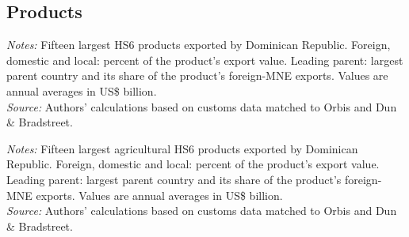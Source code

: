 \documentclass[11pt,a4paper]{article}
\begin{document}
\subsection{Products}
\begin{table}[H]\centering\footnotesize%
  \caption{Dominican Republic: Fifteen Largest Export Products}%
  \label{tab:c_hs6_DOM}%
  \par\vspace{3pt}%
  \begin{minipage}{0.95\textwidth}\footnotesize %
  \textit{Notes:} Fifteen largest HS6 products exported by Dominican Republic. Foreign, domestic and local: percent of the product's export value. Leading parent: largest parent country and its share of the product's foreign-MNE exports. Values are annual averages in US\$ billion.\\[3pt]%
  \textit{Source:} Authors' calculations based on customs data matched to Orbis and Dun \& Bradstreet.%
  \end{minipage}%
  \end{table}
\begin{table}[H]\centering\footnotesize%
  \caption{Dominican Republic, Agriculture: Fifteen Largest Export Products}%
  \label{tab:c_hs6_DOM_agro}%
  \par\vspace{3pt}%
  \begin{minipage}{0.95\textwidth}\footnotesize %
  \textit{Notes:} Fifteen largest agricultural HS6 products exported by Dominican Republic. Foreign, domestic and local: percent of the product's export value. Leading parent: largest parent country and its share of the product's foreign-MNE exports. Values are annual averages in US\$ billion.\\[3pt]%
  \textit{Source:} Authors' calculations based on customs data matched to Orbis and Dun \& Bradstreet.%
  \end{minipage}%
  \end{table}
\end{document}
